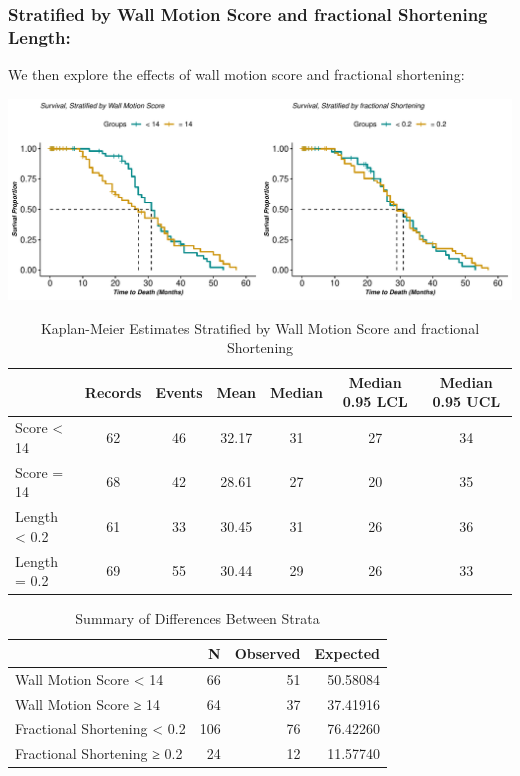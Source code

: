 \documentclass[
]{article}
\begin{document}
\hypertarget{stratified-by-wall-motion-score-and-fractional-shortening-length}{%
\subsubsection{Stratified by Wall Motion Score and fractional Shortening
Length:}\label{stratified-by-wall-motion-score-and-fractional-shortening-length}}

We then explore the effects of wall motion score and fractional
shortening:

\begin{center}\includegraphics{markdown_files/figure-latex/km.wms.fshort-1} \end{center}

\begin{table}[!h]

\caption{\label{tab:ks4}Kaplan-Meier Estimates Stratified by Wall Motion Score and fractional Shortening}
\centering
\begin{tabular}[t]{l|c|c|c|c|c|c}
\hline
  & Records & Events & Mean & Median & Median 0.95 LCL & Median 0.95 UCL\\
\hline
Score < 14 & 62 & 46 & 32.17 & 31 & 27 & 34\\
\hline
Score = 14 & 68 & 42 & 28.61 & 27 & 20 & 35\\
\hline
Length < 0.2 & 61 & 33 & 30.45 & 31 & 26 & 36\\
\hline
Length = 0.2 & 69 & 55 & 30.44 & 29 & 26 & 33\\
\hline
\end{tabular}
\end{table}

\begin{table}

\caption{\label{tab:ks4.5.survdiff}Summary of Differences Between Strata}
\centering
\begin{tabular}[t]{l|r|r|r}
\hline
  & N & Observed & Expected\\
\hline
Wall Motion Score < 14 & 66 & 51 & 50.58084\\
\hline
Wall Motion Score ≥ 14 & 64 & 37 & 37.41916\\
\hline
Fractional Shortening < 0.2 & 106 & 76 & 76.42260\\
\hline
Fractional Shortening ≥ 0.2 & 24 & 12 & 11.57740\\
\hline
\end{tabular}
\end{table}
\end{document}
